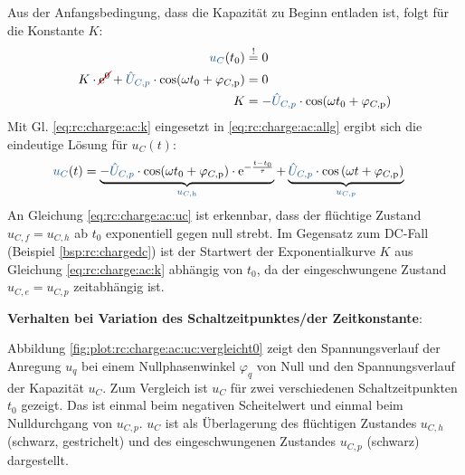 \begin{frame}[t]
{    Aus der Anfangsbedingung, dass die Kapazität zu Beginn entladen ist, folgt für die Konstante $K$:
    \begin{align}
        \ecv{u_C}(t_0) &\overset{!}{=} 0 \nonumber\\
        K \cdot \redcancel{\mathrm{e}^{0}} + \ecv{\hat{U}_{C,p}} \cdot \cos(\omega t_0 + \varphi_{C,\mathrm{p}}) &= 0 \nonumber\\
        K &= -\ecv{\hat{U}_{C,p}} \cdot \cos(\omega t_0 + \varphi_{C,\mathrm{p}}) \label{eq:rc:charge:ac:k}
    \end{align}
    Mit Gl. \ref{eq:rc:charge:ac:k} eingesetzt in \ref{eq:rc:charge:ac:allg} ergibt sich die eindeutige Lösung für $u_C(t)$:
    \begin{align}
        \ecv{u_C}(t) &= \underbrace{-\ecv{\hat{U}_{C,p}} \cdot \cos(\omega t_0 + \varphi_{C,\mathrm{p}}) \cdot \mathrm{e}^{-\frac{t-t_0}{\tau}}}_{\ecv{u_{C,\mathrm{h}}}} + \underbrace{\ecv{\hat{U}_{C,p}} \cdot \cos\left(\omega t + \varphi_{C,\mathrm{p}}\right)}_{\ecv{u_{C,p}}} \label{eq:rc:charge:ac:uc}
    \end{align}
    An Gleichung \ref{eq:rc:charge:ac:uc} ist erkennbar, dass der flüchtige Zustand $u_{C,f}=u_{C,h}$ ab $t_0$ exponentiell gegen null strebt.
    Im Gegensatz zum DC-Fall (Beispiel \ref{bsp:rc:chargedc}) ist der Startwert der Exponentialkurve $K$ aus Gleichung \ref{eq:rc:charge:ac:k} abhängig von $t_0$, da der eingeschwungene Zustand $u_{C,e}=u_{C,p}$ zeitabhängig ist.

    \textbf{Verhalten bei Variation des Schaltzeitpunktes/der Zeitkonstante}:

    Abbildung \ref{fig:plot:rc:charge:ac:uc:vergleicht0} zeigt den Spannungsverlauf der Anregung $u_q$ bei einem Nullphasenwinkel $\varphi_q$ von Null
    und den Spannungsverlauf der Kapazität $u_C$.
    Zum Vergleich ist $u_C$ für zwei verschiedenen Schaltzeitpunkten $t_0$ gezeigt.
    Das ist einmal beim negativen Scheitelwert und einmal beim Nulldurchgang von $u_{C,p}$.
    $u_C$ ist als Überlagerung des flüchtigen Zustandes $u_{C,h}$ (schwarz, gestrichelt) und des eingeschwungenen Zustandes $u_{C,p}$ (schwarz) dargestellt.

}
\end{frame}
